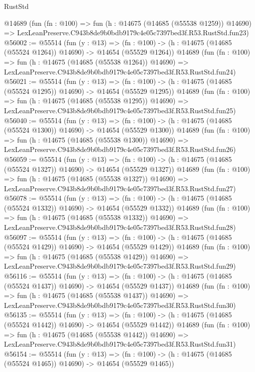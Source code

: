 \begin{lexlean}{RustStd}
\begin{coremodule}
    @14689
    (fun (fn : @100) =>
    fun (h : @14675 (@14685 (@55538 @1259)) @14690) =>
    LexLeanPreserve.C943b8de9b0bdb9179c4e05c7397bed3f.R53.RustStd.fun23)
@56002 := @55514
    (fun (y : @13) =>
    (fn : @100) -> (h : @14675 (@14685 (@55524 @1264)) @14690) -> @14654 (@55529 @1264))
    @14689
    (fun (fn : @100) =>
    fun (h : @14675 (@14685 (@55538 @1264)) @14690) =>
    LexLeanPreserve.C943b8de9b0bdb9179c4e05c7397bed3f.R53.RustStd.fun24)
@56021 := @55514
    (fun (y : @13) =>
    (fn : @100) -> (h : @14675 (@14685 (@55524 @1295)) @14690) -> @14654 (@55529 @1295))
    @14689
    (fun (fn : @100) =>
    fun (h : @14675 (@14685 (@55538 @1295)) @14690) =>
    LexLeanPreserve.C943b8de9b0bdb9179c4e05c7397bed3f.R53.RustStd.fun25)
@56040 := @55514
    (fun (y : @13) =>
    (fn : @100) -> (h : @14675 (@14685 (@55524 @1300)) @14690) -> @14654 (@55529 @1300))
    @14689
    (fun (fn : @100) =>
    fun (h : @14675 (@14685 (@55538 @1300)) @14690) =>
    LexLeanPreserve.C943b8de9b0bdb9179c4e05c7397bed3f.R53.RustStd.fun26)
@56059 := @55514
    (fun (y : @13) =>
    (fn : @100) -> (h : @14675 (@14685 (@55524 @1327)) @14690) -> @14654 (@55529 @1327))
    @14689
    (fun (fn : @100) =>
    fun (h : @14675 (@14685 (@55538 @1327)) @14690) =>
    LexLeanPreserve.C943b8de9b0bdb9179c4e05c7397bed3f.R53.RustStd.fun27)
@56078 := @55514
    (fun (y : @13) =>
    (fn : @100) -> (h : @14675 (@14685 (@55524 @1332)) @14690) -> @14654 (@55529 @1332))
    @14689
    (fun (fn : @100) =>
    fun (h : @14675 (@14685 (@55538 @1332)) @14690) =>
    LexLeanPreserve.C943b8de9b0bdb9179c4e05c7397bed3f.R53.RustStd.fun28)
@56097 := @55514
    (fun (y : @13) =>
    (fn : @100) -> (h : @14675 (@14685 (@55524 @1429)) @14690) -> @14654 (@55529 @1429))
    @14689
    (fun (fn : @100) =>
    fun (h : @14675 (@14685 (@55538 @1429)) @14690) =>
    LexLeanPreserve.C943b8de9b0bdb9179c4e05c7397bed3f.R53.RustStd.fun29)
@56116 := @55514
    (fun (y : @13) =>
    (fn : @100) -> (h : @14675 (@14685 (@55524 @1437)) @14690) -> @14654 (@55529 @1437))
    @14689
    (fun (fn : @100) =>
    fun (h : @14675 (@14685 (@55538 @1437)) @14690) =>
    LexLeanPreserve.C943b8de9b0bdb9179c4e05c7397bed3f.R53.RustStd.fun30)
@56135 := @55514
    (fun (y : @13) =>
    (fn : @100) -> (h : @14675 (@14685 (@55524 @1442)) @14690) -> @14654 (@55529 @1442))
    @14689
    (fun (fn : @100) =>
    fun (h : @14675 (@14685 (@55538 @1442)) @14690) =>
    LexLeanPreserve.C943b8de9b0bdb9179c4e05c7397bed3f.R53.RustStd.fun31)
@56154 := @55514
    (fun (y : @13) =>
    (fn : @100) -> (h : @14675 (@14685 (@55524 @1465)) @14690) -> @14654 (@55529 @1465))

\end{coremodule}
\end{lexlean}
